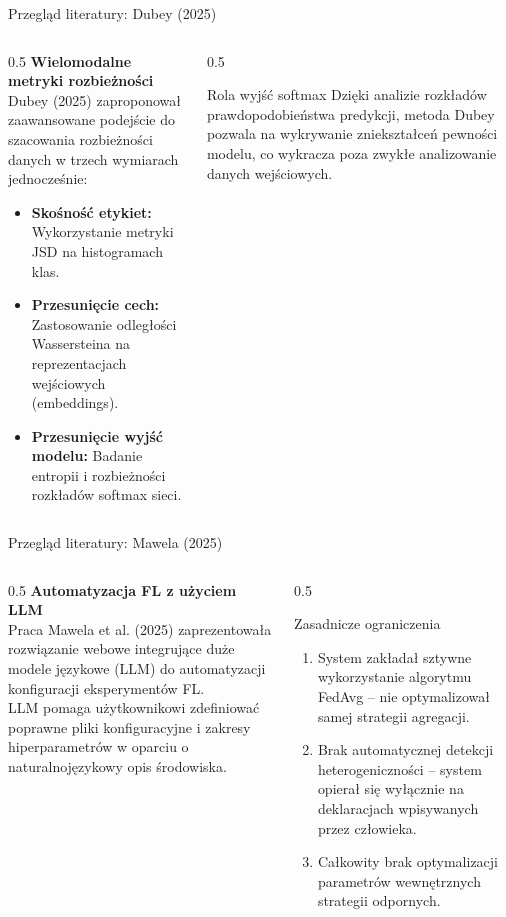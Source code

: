 \documentclass[9pt,aspectratio=169]{beamer}
\begin{document}
\begin{frame}{Przegląd literatury: Dubey (2025)}
\begin{columns}[T]
\begin{column}{0.5\textwidth}
\textbf{Wielomodalne metryki rozbieżności}\\[4pt]
Dubey (2025) zaproponował zaawansowane podejście do szacowania rozbieżności danych w trzech wymiarach jednocześnie:
\begin{itemize}\footnotesize
\item \textbf{Skośność etykiet:} Wykorzystanie metryki JSD na histogramach klas.
\item \textbf{Przesunięcie cech:} Zastosowanie odległości Wassersteina na reprezentacjach wejściowych (embeddings).
\item \textbf{Przesunięcie wyjść modelu:} Badanie entropii i rozbieżności rozkładów softmax sieci.
\end{itemize}
\end{column}
\begin{column}{0.5\textwidth}
\begin{infobox}{Rola wyjść softmax}
Dzięki analizie rozkładów prawdopodobieństwa predykcji, metoda Dubey pozwala na wykrywanie zniekształceń pewności modelu, co wykracza poza zwykłe analizowanie danych wejściowych.
\end{infobox}
\end{column}
\end{columns}
\end{frame}

\begin{frame}{Przegląd literatury: Mawela (2025)}
\begin{columns}[T]
\begin{column}{0.5\textwidth}
\textbf{Automatyzacja FL z użyciem LLM}\\[4pt]
Praca Mawela et al. (2025) zaprezentowała rozwiązanie webowe integrujące duże modele językowe (LLM) do automatyzacji konfiguracji eksperymentów FL.\\[6pt]
LLM pomaga użytkownikowi zdefiniować poprawne pliki konfiguracyjne i zakresy hiperparametrów w oparciu o naturalnojęzykowy opis środowiska.
\end{column}
\begin{column}{0.5\textwidth}
\begin{infoboxorange}{Zasadnicze ograniczenia}
\begin{enumerate}\footnotesize
\item System zakładał sztywne wykorzystanie algorytmu FedAvg -- nie optymalizował samej strategii agregacji.
\item Brak automatycznej detekcji heterogeniczności -- system opierał się wyłącznie na deklaracjach wpisywanych przez człowieka.
\item Całkowity brak optymalizacji parametrów wewnętrznych strategii odpornych.
\end{enumerate}
\end{infoboxorange}
\end{column}
\end{columns}
\end{frame}
\end{document}
